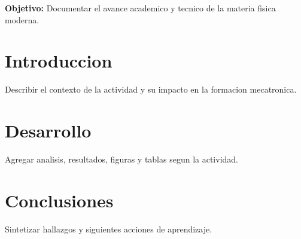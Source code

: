 \documentclass[spanish,letterpaper,oneside]{article}
\begin{document}
\templatePortrait
\templatePagecfg
\onehalfspacing

\begin{abstractd}
\textbf{Objetivo:} Documentar el avance academico y tecnico de la materia fisica moderna.
\end{abstractd}

\templateIndex
\templateFinalcfg

\section{Introduccion}
Describir el contexto de la actividad y su impacto en la formacion mecatronica.

\section{Desarrollo}
Agregar analisis, resultados, figuras y tablas segun la actividad.

\section{Conclusiones}
Sintetizar hallazgos y siguientes acciones de aprendizaje.



\end{document}
